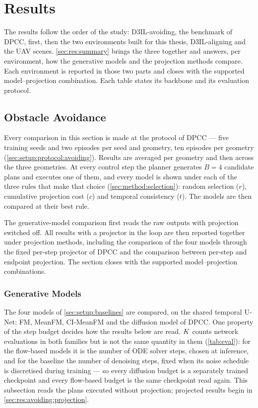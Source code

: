 \chapter{Results}\label{ch:results}

The results follow the order of the study: D3IL-avoiding, the benchmark of \ac{DPCC}, first, then
the two environments built for this thesis, D3IL-aligning and the UAV scenes. \autoref{sec:res:summary} brings the three together and
answers, per environment, how the generative models and the projection methods compare. Each
environment is reported in those two parts and closes with the supported model--projection combination.
Each table states its backbone and its evaluation protocol.

\section{Obstacle Avoidance}\label{sec:res:state}

Every comparison in this section is made at the protocol of \ac{DPCC} --- five training seeds and two
episodes per seed and geometry, ten episodes per geometry (\autoref{sec:setup:protocol:avoiding}).
Results are averaged per geometry and then across the three geometries. At every control step the planner generates
$B=4$ candidate plans and executes one of them, and every model is shown under each of the three rules
that make that choice (\autoref{sec:method:selection}): random selection ($r$), cumulative projection
cost ($c$) and temporal consistency ($t$). The models are then compared at their best rule.

The generative-model comparison first reads the raw outputs with projection switched off. All results
with a projector in the loop are then reported together under projection methods, including the
comparison of the four models through the fixed per-step projector of \ac{DPCC} and the comparison
between per-step and endpoint projection. The section closes with the supported model--projection
combinations.

\subsection{Generative Models}\label{sec:res:avoiding:models}

The four models of \autoref{sec:setup:baselines} are compared, on the shared temporal U-Net: FM,
MeanFM, CI-MeanFM and the diffusion model of \ac{DPCC}. One property of the step budget decides how the
results below are read. $K$ counts network evaluations in both families but is not the same quantity
in them (\autoref{tab:eval}): for the flow-based models it is the number of ODE solver steps, chosen at
inference, and for the baseline the number of denoising steps, fixed when its noise schedule is
discretised during training --- so every diffusion budget is a separately trained checkpoint and every
flow-based budget is the same checkpoint read again. This subsection reads the plans executed without
projection; projected results begin in \autoref{sec:res:avoiding:projection}.

